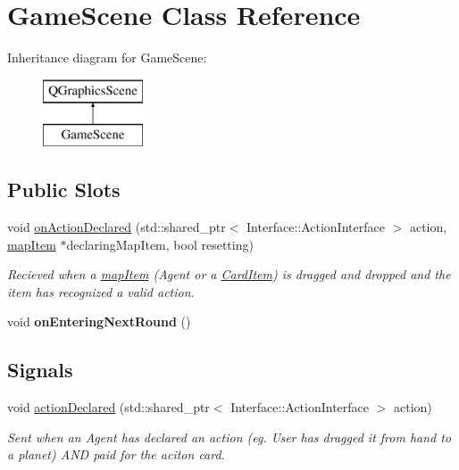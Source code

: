 \hypertarget{class_game_scene}{\section{Game\-Scene Class Reference}
\label{class_game_scene}
}
Inheritance diagram for Game\-Scene\-:\begin{figure}[H]
\begin{center}
\leavevmode
\includegraphics[height=2.000000cm]{class_game_scene}
\end{center}
\end{figure}
\subsection*{Public Slots}
\begin{DoxyCompactItemize}
\item 
void \hyperlink{class_game_scene_aa9cca2fe921183eca8d44d7d57cd2c11}{on\-Action\-Declared} (std\-::shared\-\_\-ptr$<$ Interface\-::\-Action\-Interface $>$ action, \hyperlink{classmap_item}{map\-Item} $\ast$declaring\-Map\-Item, bool resetting)
\begin{DoxyCompactList}\small\item\em Recieved when a \hyperlink{classmap_item}{map\-Item} (Agent or a \hyperlink{class_card_item}{Card\-Item}) is dragged and dropped and the item has recognized a valid action. \end{DoxyCompactList}\item 
\hypertarget{class_game_scene_a0001cdbbd1652668fff2d88c44f6d98f}{void {\bfseries on\-Entering\-Next\-Round} ()}\label{class_game_scene_a0001cdbbd1652668fff2d88c44f6d98f}

\end{DoxyCompactItemize}
\subsection*{Signals}
\begin{DoxyCompactItemize}
\item 
void \hyperlink{class_game_scene_a94f992c47762987c54c8dc17c142d6cf}{action\-Declared} (std\-::shared\-\_\-ptr$<$ Interface\-::\-Action\-Interface $>$ action)
\begin{DoxyCompactList}\small\item\em Sent when an Agent has declared an action (eg. User has dragged it from hand to a planet) A\-N\-D paid for the aciton card. \end{DoxyCompactList}\end{DoxyCompactItemize}
